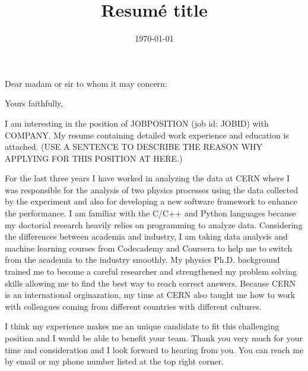 \documentclass[11pt,letterpaper]{moderncv}   %
\title{Resumé title}                               %
\begin{document}
%
%

\date{\today}

\opening{Dear madam or sir to whom it may concern:}
\closing{Yours faithfully,} %

\makelettertitle

%
%
%

\justifying
I am interesting in the position of JOBPOSITION (job id: JOBID) with COMPANY.
My resume containing detailed work experience and education is attached.
(USE A SENTENCE TO DESCRIBE THE REASON WHY APPLYING FOR THIS POSITION AT HERE.)

For the last three years I have worked in analyzing the data at CERN where I was responsible for the analysis of two physics processes using the data collected by the experiment and also for developing a new software framework to enhance the performance.
I am familiar with the C/C++ and Python languages because my doctorial research heavily relies on programming to analyze data.
Considering the differences between academia and industry, I am taking data analysis and machine learning courses from Codecademy and Coursera to help me to switch from the academia to the industry smoothly.
My physics Ph.D. background trained me to become a careful researcher and strengthened my problem solving skills allowing me to find the best way to reach correct answers.
Because CERN is an international orginazation, my time at CERN also taught me how to work with colleagues coming from different countries with different cultures.

I think my experience makes me an unique candidate to fit this challenging position and I would be able to benefit your team.
Thank you very much for your time and consideration and I look forward to hearing from you.
You can reach me by email or my phone number listed at the top right corner.

\vspace{0.5cm}

\makeletterclosing
\end{document}
